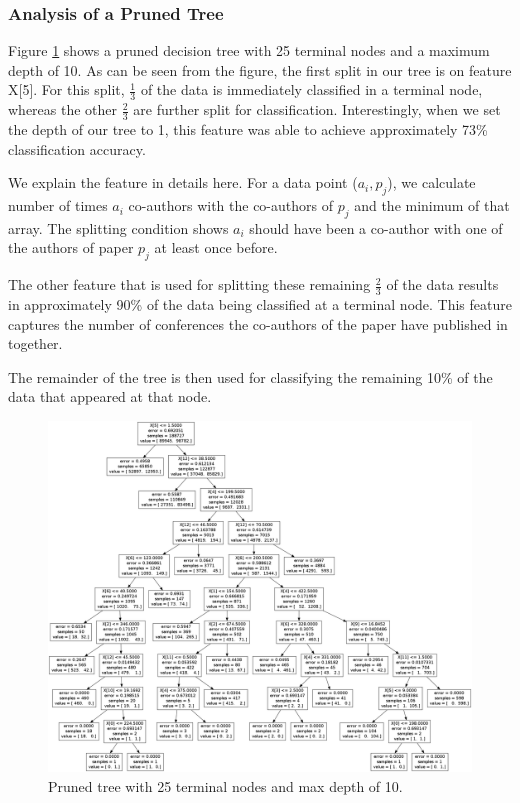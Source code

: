 \documentclass[letterpaper,12pt]{article}
\begin{document}
\subsubsection{Analysis of a Pruned Tree}
Figure \ref{fig:tree} shows a pruned decision tree with 25 terminal nodes and a maximum depth of 10. As can be seen from the figure, the first split in our tree is on feature X[5]. For this split, $\frac{1}{3}$ of the data is immediately classified in a terminal node, whereas the other $\frac{2}{3}$ are further split for classification. Interestingly, when we set the depth of our tree to 1, this feature was able to achieve approximately 73\% classification accuracy. 

We explain the feature in details here. For a data point ($a_i, p_j$), we calculate number of times $a_i$ co-authors with the co-authors of $p_j$ and the minimum of that array. The splitting condition shows $a_i$ should have been a co-author with one of the authors of paper $p_j$ at least once before.

The other feature that is used for splitting these remaining $\frac{2}{3}$ of the data results in approximately 90\% of the data being classified at a terminal node. This feature captures the number of conferences the co-authors of the paper have published in together.

The remainder of the tree is then used for classifying the remaining 10\% of the data that appeared at that node.


\begin{figure}[ht!]
\includegraphics[width=\textwidth]{images/boss.png}
\caption{Pruned tree with 25 terminal nodes and max depth of 10.}\label{fig:tree}
\end{figure}
\end{document}
